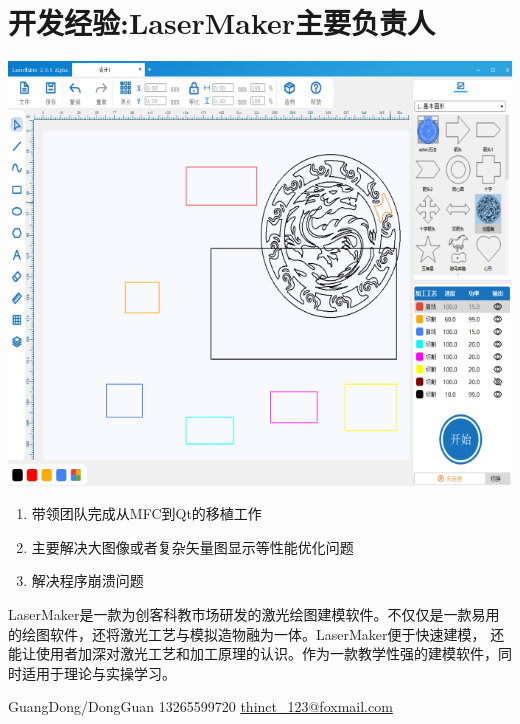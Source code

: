 \documentclass[lighthipster]{simplehipstercv}
\begin{document}
	\begin{minipage}[t]{\textwidth}
		\section*{开发经验:LaserMaker主要负责人}
		\begin{minipage}[thbp]{0.3\textwidth}
			\includegraphics[width=\linewidth]{PrjTL_1.png}
		\end{minipage} \hfill
		\begin{minipage}[thbp!]{0.6\textwidth}
			\begin{enumerate}
				\item 带领团队完成从MFC到Qt的移植工作
				\item 主要解决大图像或者复杂矢量图显示等性能优化问题
				\item 解决程序崩溃问题
			\end{enumerate}
			LaserMaker是一款为创客科教市场研发的激光绘图建模软件。不仅仅是一款易用的绘图软件，还将激光工艺与模拟造物融为一体。LaserMaker便于快速建模，
			还能让使用者加深对激光工艺和加工原理的认识。作为一款教学性强的建模软件，同时适用于理论与实操学习。
		\end{minipage}
		\bigskip
	\end{minipage}
	
	\vspace{0.1em}
	
	\vfill{} %
	
	\setlength{\parindent}{0pt}
	\begin{minipage}[t]{\linewidth}
		\begin{flushright}\fontfamily{\sfdefault}\selectfont \color{black!70}
			{ GuangDong/DongGuan  13265599720  \protect\url{thinct_123@foxmail.com}
			}
		\end{flushright}
	\end{minipage}
	
\end{document}
